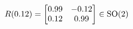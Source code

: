 \documentclass[preview]{standalone}
\begin{document}
\begin{align*}
\special{dvisvgm:raw <g id='unique000'>}R(0.12) = \begin{bmatrix} 0.99 & -0.12 \\ 0.12 & 0.99 \end{bmatrix} \in \text{SO}(2)\special{dvisvgm:raw </g>}
\end{align*}
\end{document}
